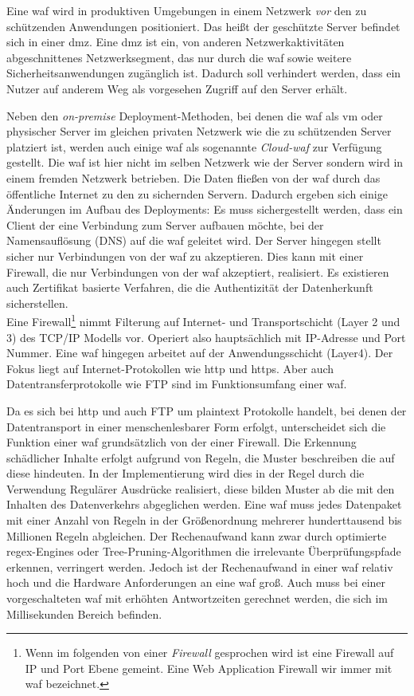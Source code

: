 Eine \ac{waf} wird in produktiven Umgebungen in einem Netzwerk \textit{vor} den zu schützenden Anwendungen positioniert.
Das heißt der geschützte Server befindet sich in einer \ac{dmz}.
Eine \ac{dmz} ist ein, von anderen Netzwerkaktivitäten abgeschnittenes Netzwerksegment, das nur durch die \ac{waf} sowie weitere Sicherheitsanwendungen zugänglich ist.
Dadurch soll verhindert werden, dass ein Nutzer auf anderem Weg als vorgesehen Zugriff auf den Server erhält.

Neben den \textit{on-premise} Deployment-Methoden, bei denen die \ac{waf} als \ac{vm} oder physischer Server im gleichen privaten Netzwerk wie die zu schützenden Server platziert ist, werden auch einige \ac{waf} als sogenannte \textit{Cloud-\ac{waf}} zur Verfügung gestellt.
Die \ac{waf} ist hier nicht im selben Netzwerk wie der Server sondern wird in einem fremden Netzwerk betrieben.
Die Daten fließen von der \ac{waf} durch das öffentliche Internet zu den zu sichernden Servern.
Dadurch ergeben sich einige Änderungen im Aufbau des Deployments:
Es muss sichergestellt werden, dass ein Client der eine Verbindung zum Server aufbauen möchte, bei der Namensauflösung (DNS) auf die \ac{waf} geleitet wird.
Der Server hingegen stellt sicher nur Verbindungen von der \ac{waf} zu akzeptieren.
Dies kann mit einer Firewall, die nur Verbindungen von der \ac{waf} akzeptiert, realisiert.
Es existieren auch Zertifikat basierte Verfahren, die die Authentizität der Datenherkunft sicherstellen.\\


Eine Firewall\footnote{Wenn im folgenden von einer \textit{Firewall} gesprochen wird ist eine Firewall auf IP und Port Ebene gemeint. Eine Web Application Firewall wir immer mit \ac{waf} bezeichnet.} nimmt Filterung auf Internet- und Transportschicht (Layer 2 und 3) des TCP/IP Modells vor.
Operiert also hauptsächlich mit IP-Adresse und Port Nummer.
Eine \ac{waf} hingegen arbeitet auf der Anwendungsschicht (Layer4).
Der Fokus liegt auf Internet-Protokollen wie \ac{http} und \ac{https}. 
Aber auch Datentransferprotokolle wie FTP sind im Funktionsumfang einer \ac{waf}.

Da es sich bei \ac{http} und auch FTP um plaintext Protokolle handelt, bei denen der Datentransport in einer menschenlesbarer Form erfolgt, unterscheidet sich die Funktion einer \ac{waf} grundsätzlich von der einer Firewall.
Die Erkennung schädlicher Inhalte erfolgt aufgrund von Regeln, die Muster beschreiben die auf diese hindeuten.
In der Implementierung wird dies in der Regel durch die Verwendung Regulärer Ausdrücke realisiert, diese bilden Muster ab die mit den Inhalten des Datenverkehrs abgeglichen werden.
Eine \ac{waf} muss jedes Datenpaket mit einer Anzahl von Regeln in der Größenordnung mehrerer hunderttausend bis Millionen Regeln abgleichen.
Der Rechenaufwand kann zwar durch optimierte regex-Engines oder Tree-Pruning-Algorithmen die irrelevante Überprüfungspfade erkennen, verringert werden.
Jedoch ist der Rechenaufwand in einer \ac{waf} relativ hoch und die Hardware Anforderungen an eine \ac{waf} groß.
Auch muss bei einer vorgeschalteten \ac{waf} mit erhöhten Antwortzeiten gerechnet werden, die sich im Millisekunden Bereich befinden.

